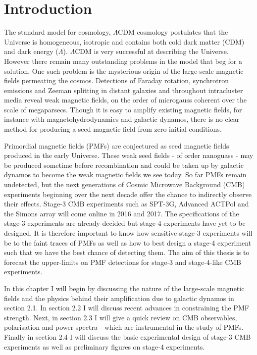\section{Introduction}

The standard model for cosmology, $\Lambda$CDM cosmology postulates that the Universe is homogeneous, isotropic and contains both cold dark matter (CDM) and dark energy ($\Lambda$). $\Lambda$CDM is very successful at describing the Universe. However there remain many outstanding problems in the model that beg for a solution. One such problem is the mysterious origin of the large-scale magnetic fields permeating the cosmos. Detections of Faraday rotation, synchrotron emissions and Zeeman splitting in distant galaxies and throughout intracluster media reveal weak magnetic fields, on the order of microgauss coherent over the scale of megaparsecs. Though it is easy to amplify existing magnetic fields, for instance with magnetohydrodynamics and galactic dynamos, there is no clear method for producing a seed magnetic field from zero initial conditions.

Primordial magnetic fields (PMFs) are conjectured as seed magnetic fields produced in the early Universe. These weak seed fields - of order nanoguass -  may be produced sometime before recombination and could be taken up by galactic dynamos to become the weak magnetic fields we see today. So far PMFs remain undetected, but the next generations of Cosmic Microwave Background (CMB) experiments beginning over the next decade offer the chance to indirectly observe their effects. Stage-3 CMB experiments such as SPT-3G, Advanced ACTPol and the Simons array will come online in 2016 and 2017. The specifications of the stage-3 experiments are already decided but stage-4 experiments have yet to be designed. It is therefore important to know how sensitive stage-3 experiments will be to the faint traces of PMFs as well as how to best design a stage-4 experiment such that we have the best chance of detecting them. The aim of this thesis is to forecast the upper-limits on PMF detections for stage-3 and stage-4-like CMB experiments.

In this chapter I will begin by discussing the nature of the large-scale magnetic fields and the physics behind their amplification due to galactic dynamos in section 2.1. In section 2.2 I will discuss recent advances in constraining the PMF strength. Next, in section 2.3 I will give a quick review on CMB observables, polarisation and power spectra - which are instrumental in the study of PMFs. Finally in section 2.4 I will discuss the basic experimental design of stage-3 CMB experiments as well as preliminary figures on stage-4 experiments.

